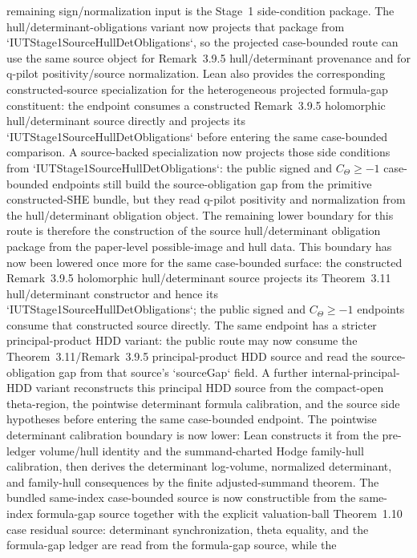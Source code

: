 \documentclass[11pt]{article}
\newcommand{\CTheta}{C_\Theta}
\theoremstyle{plain}
\theoremstyle{definition}
\theoremstyle{remark}
\begin{document}
remaining sign/normalization input is the Stage~1 side-condition package.
The hull/determinant-obligations variant now projects that package from
`IUTStage1SourceHullDetObligations`, so the projected case-bounded route can
use the same source object for Remark~3.9.5 hull/determinant provenance and
for q-pilot positivity/source normalization.
Lean also provides the corresponding constructed-source specialization for the
heterogeneous projected formula-gap constituent: the endpoint consumes a
constructed Remark~3.9.5 holomorphic hull/determinant source directly and
projects its `IUTStage1SourceHullDetObligations` before entering the same
case-bounded comparison.
A source-backed specialization now projects those side conditions from
`IUTStage1SourceHullDetObligations`: the public signed and
\(\CTheta\ge -1\) case-bounded endpoints still build the source-obligation gap
from the primitive constructed-SHE bundle, but they read q-pilot positivity and
normalization from the hull/determinant obligation object.  The remaining lower
boundary for this route is therefore the construction of the source
hull/determinant obligation package from the paper-level possible-image and
hull data.
This boundary has now been lowered once more for the same case-bounded surface:
the constructed Remark~3.9.5 holomorphic hull/determinant source projects its
Theorem~3.11 hull/determinant constructor and hence its
`IUTStage1SourceHullDetObligations`; the public signed and
\(\CTheta\ge -1\) endpoints consume that constructed source directly.  The
same endpoint has a stricter principal-product HDD variant: the public route may
now consume the Theorem~3.11/Remark~3.9.5 principal-product HDD source and read
the source-obligation gap from that source's `sourceGap` field.  A further
internal-principal-HDD variant reconstructs this principal HDD source from the
compact-open theta-region, the pointwise determinant formula calibration, and
the source side hypotheses before entering the same case-bounded endpoint.  The
pointwise determinant calibration boundary is now lower: Lean constructs it from
the pre-ledger volume/hull identity and the summand-charted Hodge family-hull
calibration, then derives the determinant log-volume, normalized determinant,
and family-hull consequences by the finite adjusted-summand theorem.  The
bundled same-index case-bounded source is now constructible from the
same-index formula-gap source together with the explicit valuation-ball
Theorem~1.10 case residual source: determinant synchronization, theta equality,
and the formula-gap ledger are read from the formula-gap source, while the
\end{document}
